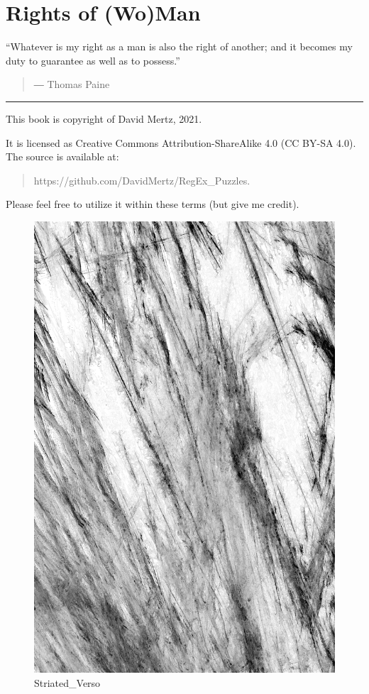 \hypertarget{rights-of-woman}{%
\chapter{Rights of (Wo)Man}\label{rights-of-woman}}

``Whatever is my right as a man is also the right of another; and it
becomes my duty to guarantee as well as to possess.''

\begin{quote}
― Thomas Paine
\end{quote}

\begin{center}\rule{0.5\linewidth}{0.5pt}\end{center}

This book is copyright of David Mertz, 2021.

It is licensed as Creative Commons Attribution-ShareAlike 4.0 (CC BY-SA
4.0). The source is available at:

\begin{quote}
https://github.com/DavidMertz/RegEx\_Puzzles.
\end{quote}

Please feel free to utilize it within these terms (but give me credit).

\begin{figure}
\centering
\includegraphics{images/Striated_Verso.png}
\caption{Striated\_Verso}
\end{figure}


